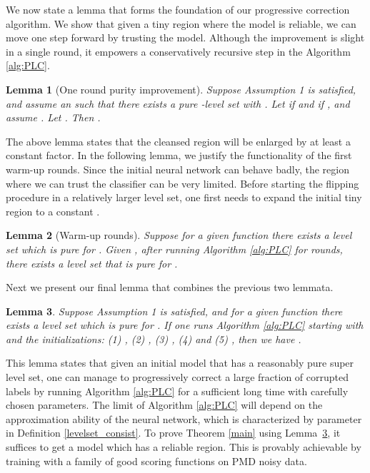 \documentclass{article} \usepackage{iclr2021_conference,times}
\newtheorem{lemma}{Lemma}
\begin{document}
We now state a lemma that forms the foundation of our progressive correction algorithm. We show that given a tiny region where the model is reliable, we can move one step forward by trusting the model. Although the improvement is slight in a single round, it empowers a conservatively  recursive step in the Algorithm \ref{alg:PLC}.

\begin{lemma}[One round purity improvement] \label{one_round}
Suppose Assumption 1 is satisfied, and assume an  such that there exists a pure -level set with . Let  if  and  if  , and assume .
Let . Then .


\end{lemma}

The above lemma states that the cleansed region will be enlarged by at least a constant factor. In the following lemma, we justify the functionality of the first  warm-up rounds. Since the initial neural network can behave badly, the region where we can trust the classifier can be very limited. Before starting the flipping procedure in a relatively larger level set, one first needs to expand the initial tiny region  to a constant .  
\begin{lemma}[Warm-up rounds] \label{First stage}
Suppose for a given function  there exists a level set  which is pure for . Given , after running Algorithm \ref{alg:PLC} for  rounds, there exists a level set  that is pure for .  
\end{lemma}

Next we present our final lemma that combines the previous two lemmata. 

\begin{lemma} \label{main2}
Suppose Assumption 1 is satisfied, and for a given function  there exists a level set  which is pure for . If one runs Algorithm \ref{alg:PLC} starting with  and the initializations: (1) , (2) , (3) , (4)  and (5) , then we have .
\end{lemma}

This lemma states that given an initial model that has a reasonably pure super level set, one can manage to progressively correct a large fraction of corrupted labels by running Algorithm \ref{alg:PLC} for a sufficient long time with carefully chosen parameters. The limit of Algorithm \ref{alg:PLC} will depend on the approximation ability of the neural network, which is characterized by parameter  in Definition \ref{levelset_consist}. 
To prove  Theorem \ref{main} using Lemma~\ref{main2}, it suffices to get a model which has a reliable region. This is provably achievable by training with a family of good scoring functions on PMD noisy data.
\end{document}
